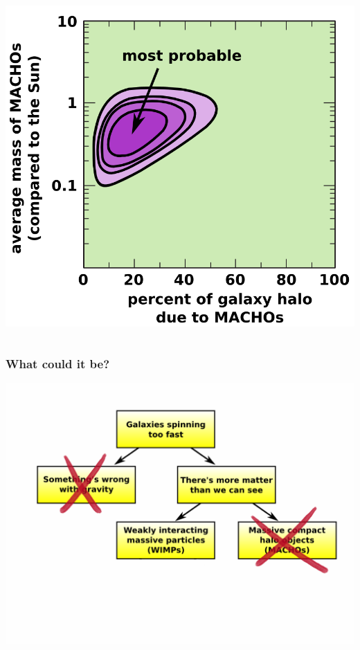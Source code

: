 \documentclass[compress]{beamer}
\begin{document}
\begin{frame}
\begin{columns}
\includegraphics[width=\linewidth]{pictures/microlensing_results.png}
\end{columns}
\end{frame}

\begin{frame}
\frametitle{What could it be?}
\begin{center}
\includegraphics[width=\linewidth]{pictures/flow_chart_2_X.png}
\end{center}
\end{frame}
\end{document}
